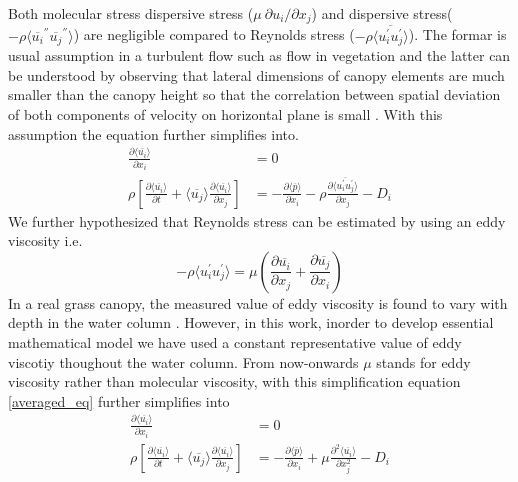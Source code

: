 \documentclass[12pt]{report}   %
\newcommand{\del}{\partial}
\renewcommand{\bar}{\overline}
\begin{document}
 Both molecular stress dispersive stress ($ \mu\ \del u_i / \del x_j $) and dispersive stress($-\rho \langle \bar{u_i}^{''} \bar{u_j}^{''} \rangle $) are negligible compared to Reynolds stress ($-\rho \langle\bar{ u_i^{'} u_j^{'} } \rangle $). The formar is usual assumption in a turbulent flow such as flow in vegetation and the latter can be understood by observing that
 lateral dimensions of canopy elements are much smaller than the canopy height so that the correlation between spatial deviation of both components of velocity on horizontal plane is small \cite{Raupach94,Raupach96}. With this assumption the equation further simplifies into.
 \begin{equation}\label{averaged_eq2}
  \begin{split}
  \frac{\partial \langle \bar{u_i} \rangle}{\partial x_i}&=0 \\
 \rho \left[ \frac{\partial \langle \overline{u_i} \rangle }{\partial t}+ \langle \overline{u_j} \rangle \frac{\partial \langle \bar{u_i} \rangle}{\partial x_j} \right ] &= -\frac{\partial \langle \bar{p} \rangle  }{\partial x_i} -\rho \frac{\partial \langle \bar{u_i^{'}u_j^{'}} \rangle }{\partial x_j} -D_i
 \end{split}
\end{equation}
We further hypothesized that Reynolds stress can be estimated by using an eddy viscosity i.e. 
\[ -\rho \langle u_i^{'} u_j^{'} \rangle = \mu \left(\frac{\del \bar{u_i} }{\del x_j} + \frac{\del \bar {u_j} }{\del x_i}  \right)\]
In a real grass canopy, the measured value of eddy viscosity is found to vary with depth in the water column \cite{Nepf04}. However, in this work, inorder to develop essential mathematical model we have used a constant representative value of eddy viscotiy thoughout the water column.
From now-onwards $\mu$ stands for eddy viscosity rather than molecular viscosity, with this simplification equation \ref{averaged_eq} further simplifies into
 \begin{equation}\label{averaged_eq3}
  \begin{split}
  \frac{\partial \langle \bar{u_i} \rangle}{\partial x_i}&=0 \\
 \rho \left[ \frac{\partial \langle \overline{u_i} \rangle }{\partial t}+ \langle \overline{u_j} \rangle \frac{\partial \langle \bar{u_i} \rangle}{\partial x_j} \right ] &= -\frac{\partial \langle \bar{p} \rangle  }{\partial x_i} +\mu \frac{\partial^2 \langle \bar{u_i} \rangle }{\partial x_j^2} - D_i
 \end{split}
\end{equation}
\end{document}
